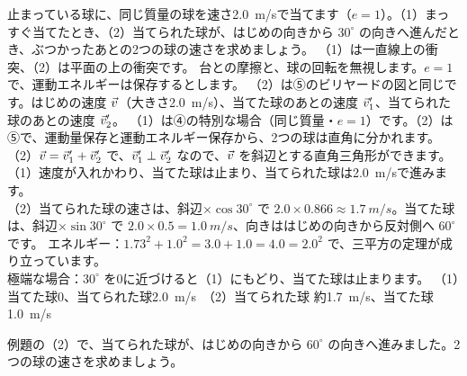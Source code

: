 \label{ph:力-3:ex11}
\begin{phreidai}[ビリヤードの球]
止まっている球に、同じ質量の球を速さ\qty{2.0}{m/s}で当てます（$e=1$）。（1）まっすぐ当てたとき、（2）当てられた球が、はじめの向きから $30^\circ$ の向きへ進んだとき、ぶつかったあとの2つの球の速さを求めましょう。
\phbamen
（1）は一直線上の衝突、（2）は平面の上の衝突です。
\phmushi
台との摩擦と、球の回転を無視します。$e=1$ で、運動エネルギーは保存するとします。
\phzu
（2）は⑤のビリヤードの図と同じです。はじめの速度 $\vec{v}$（大きさ\qty{2.0}{m/s}）、当てた球のあとの速度 $\vec{v}_1'$、当てられた球のあとの速度 $\vec{v}_2'$。
\phriyu
（1）は④の特別な場合（同じ質量・$e=1$）です。（2）は⑤で、運動量保存と運動エネルギー保存から、2つの球は直角に分かれます。
\phtateru
（2）$\vec{v}=\vec{v}_1'+\vec{v}_2'$ で、$\vec{v}_1'\perp\vec{v}_2'$ なので、$\vec{v}$ を斜辺とする直角三角形ができます。
\phtoku
（1）速度が入れかわり、当てた球は止まり、当てられた球は\qty{2.0}{m/s}で進みます。\\
（2）当てられた球の速さは、斜辺×$\cos30^\circ$ で $2.0\times0.866\approx\qty{1.7}{m/s}$。当てた球は、斜辺×$\sin30^\circ$ で $2.0\times0.5=\qty{1.0}{m/s}$、向きははじめの向きから反対側へ $60^\circ$ です。
\phtashikame
エネルギー：$1.73^2+1.0^2=3.0+1.0=4.0=2.0^2$ で、三平方の定理が成り立っています。\\
極端な場合：$30^\circ$ を0に近づけると（1）にもどり、当てた球は止まります。
\kotae （1）当てた球0、当てられた球\qty{2.0}{m/s}　（2）当てられた球 約\qty{1.7}{m/s}、当てた球\qty{1.0}{m/s}
\end{phreidai}
\begin{jibun}
例題の（2）で、当てられた球が、はじめの向きから $60^\circ$ の向きへ進みました。2つの球の速さを求めましょう。
\end{jibun}

